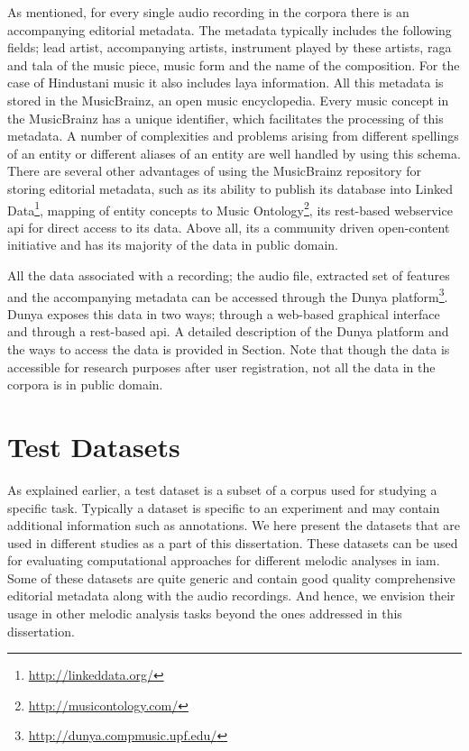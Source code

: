As mentioned, for every single audio recording in the corpora there is an accompanying editorial metadata. The metadata typically includes the following fields; lead artist, accompanying artists, instrument played by these artists, \gls{raga} and \gls{tala} of the music piece, music form and the name of the composition. For the case of Hindustani music it also includes \gls{laya} information. All this metadata is stored in the MusicBrainz, an open music encyclopedia. Every music concept in the MusicBrainz has a unique identifier, which facilitates the processing of this metadata. A number of complexities and problems arising from different spellings of an entity or different aliases of an entity are well handled by using this schema. There are several other advantages of using the MusicBrainz repository for storing editorial metadata, such as its ability to publish its database into Linked Data\footnote{\url{http://linkeddata.org/}}, mapping of entity concepts to Music Ontology\footnote{\url{http://musicontology.com/}}, its \acrshort{rest}-based webservice \acrshort{api} for direct access to its data. Above all, its a community driven open-content initiative and has its majority of the data in public domain.

All the data associated with a recording; the audio file, extracted set of features and the accompanying metadata can be accessed through the Dunya platform\footnote{\url{http://dunya.compmusic.upf.edu/}}. Dunya exposes this data in two ways; through a web-based graphical interface and through a \acrshort{rest}-based \acrshort{api}. A detailed description of the Dunya platform and the ways to access the data is provided in Section. Note that though the data is accessible for research purposes after user registration, not all the data in the corpora is in public domain. 



\section{Test Datasets}
\label{sec:corpus_test_datasets}

As explained earlier, a test dataset is a subset of a corpus used for studying a specific task. Typically a dataset is specific to an experiment and may contain additional information such as annotations. We here present the datasets that are used in different studies as a part of this dissertation. These datasets can be used for evaluating computational approaches for different melodic analyses in \gls{iam}. Some of these datasets are quite generic and contain good quality comprehensive editorial metadata along with the audio recordings. And hence, we envision their usage in other melodic analysis tasks beyond the ones addressed in this dissertation.


